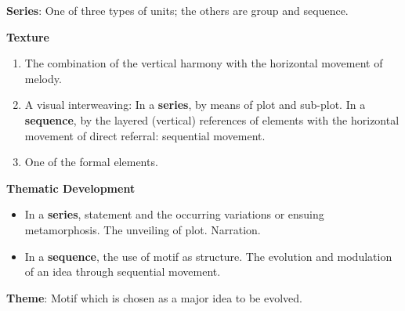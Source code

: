 \documentclass[12pt]{extarticle}
\begin{document}
\textbf{Series}: One of three types of units; the others are group and sequence.

\textbf{Texture}
\begin{enumerate}
  \item The combination of the vertical harmony with the horizontal movement of melody.
  \item A visual interweaving: In a \textbf{series}, by means of plot and sub-plot. In a \textbf{sequence}, by the layered (vertical) references of elements with the horizontal movement of direct referral: sequential movement.
  \item One of the formal elements.
\end{enumerate}

\textbf{Thematic Development}
\begin{itemize}
  \item In a \textbf{series}, statement and the occurring variations or ensuing metamorphosis. The unveiling of plot. Narration.
  \item In a \textbf{sequence}, the use of motif as structure. The evolution and modulation of an idea through sequential movement.
\end{itemize}

\textbf{Theme}: Motif which is chosen as a major idea to be evolved.
\end{document}

